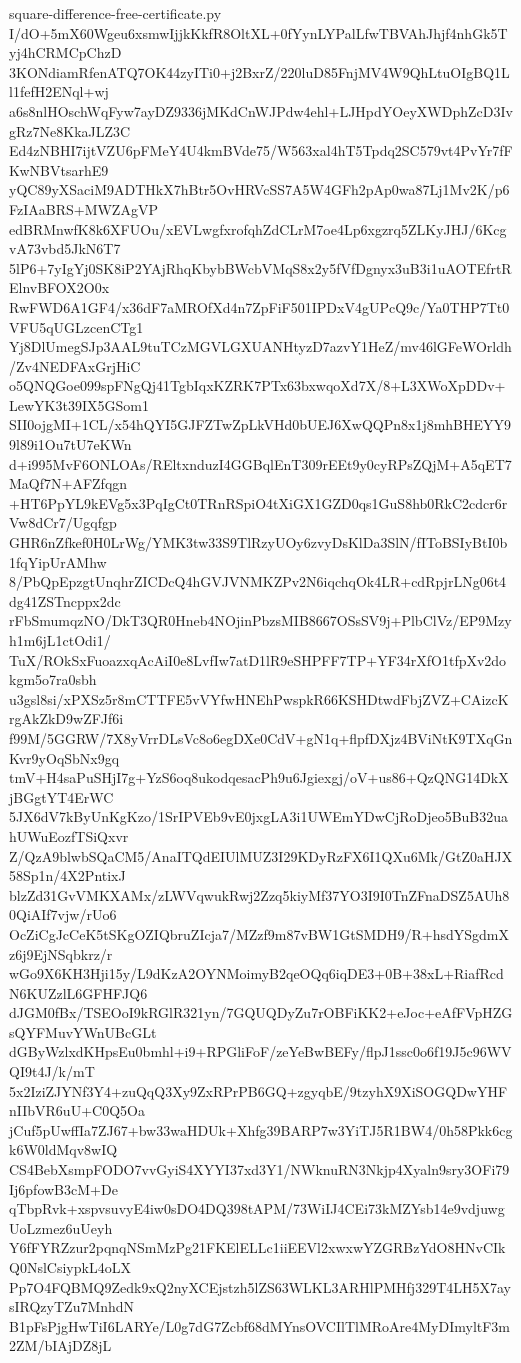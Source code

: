 \documentclass[11pt]{article}
\theoremstyle{definition}
\theoremstyle{remark}
\begin{document}
\begin{filecontents*}[overwrite]{square-difference-free-certificate.py}
I/dO+5mX60Wgeu6xsmwIjjkKkfR8OltXL+0fYynLYPalLfwTBVAhJhjf4nhGk5Tyj4hCRMCpChzD
3KONdiamRfenATQ7OK44zyITi0+j2BxrZ/220luD85FnjMV4W9QhLtuOIgBQ1Ll1fefH2ENql+wj
a6s8nlHOschWqFyw7ayDZ9336jMKdCnWJPdw4ehl+LJHpdYOeyXWDphZcD3IvgRz7Ne8KkaJLZ3C
Ed4zNBHI7ijtVZU6pFMeY4U4kmBVde75/W563xal4hT5Tpdq2SC579vt4PvYr7fFKwNBVtsarhE9
yQC89yXSaciM9ADTHkX7hBtr5OvHRVcSS7A5W4GFh2pAp0wa87Lj1Mv2K/p6FzIAaBRS+MWZAgVP
edBRMnwfK8k6XFUOu/xEVLwgfxrofqhZdCLrM7oe4Lp6xgzrq5ZLKyJHJ/6KcgvA73vbd5JkN6T7
5lP6+7yIgYj0SK8iP2YAjRhqKbybBWcbVMqS8x2y5fVfDgnyx3uB3i1uAOTEfrtRElnvBFOX2O0x
RwFWD6A1GF4/x36dF7aMROfXd4n7ZpFiF501IPDxV4gUPcQ9c/Ya0THP7Tt0VFU5qUGLzcenCTg1
Yj8DlUmegSJp3AAL9tuTCzMGVLGXUANHtyzD7azvY1HeZ/mv46lGFeWOrldh/Zv4NEDFAxGrjHiC
o5QNQGoe099spFNgQj41TgbIqxKZRK7PTx63bxwqoXd7X/8+L3XWoXpDDv+LewYK3t39IX5GSom1
SII0ojgMI+1CL/x54hQYI5GJFZTwZpLkVHd0bUEJ6XwQQPn8x1j8mhBHEYY99l89i1Ou7tU7eKWn
d+i995MvF6ONLOAs/REltxnduzI4GGBqlEnT309rEEt9y0cyRPsZQjM+A5qET7MaQf7N+AFZfqgn
+HT6PpYL9kEVg5x3PqIgCt0TRnRSpiO4tXiGX1GZD0qs1GuS8hb0RkC2cdcr6rVw8dCr7/Ugqfgp
GHR6nZfkef0H0LrWg/YMK3tw33S9TlRzyUOy6zvyDsKlDa3SlN/fIToBSIyBtI0b1fqYipUrAMhw
8/PbQpEpzgtUnqhrZICDcQ4hGVJVNMKZPv2N6iqchqOk4LR+cdRpjrLNg06t4dg41ZSTncppx2dc
rFbSmumqzNO/DkT3QR0Hneb4NOjinPbzsMIB8667OSsSV9j+PlbClVz/EP9Mzyh1m6jL1ctOdi1/
TuX/ROkSxFuoazxqAcAiI0e8LvfIw7atD1lR9eSHPFF7TP+YF34rXfO1tfpXv2dokgm5o7ra0sbh
u3gsl8si/xPXSz5r8mCTTFE5vVYfwHNEhPwspkR66KSHDtwdFbjZVZ+CAizcKrgAkZkD9wZFJf6i
f99M/5GGRW/7X8yVrrDLsVc8o6egDXe0CdV+gN1q+flpfDXjz4BViNtK9TXqGnKvr9yOqSbNx9gq
tmV+H4saPuSHjI7g+YzS6oq8ukodqesacPh9u6Jgiexgj/oV+us86+QzQNG14DkXjBGgtYT4ErWC
5JX6dV7kByUnKgKzo/1SrIPVEb9vE0jxgLA3i1UWEmYDwCjRoDjeo5BuB32uahUWuEozfTSiQxvr
Z/QzA9blwbSQaCM5/AnaITQdEIUlMUZ3I29KDyRzFX6I1QXu6Mk/GtZ0aHJX58Sp1n/4X2PntixJ
blzZd31GvVMKXAMx/zLWVqwukRwj2Zzq5kiyMf37YO3I9I0TnZFnaDSZ5AUh80QiAIf7vjw/rUo6
OcZiCgJcCeK5tSKgOZIQbruZIcja7/MZzf9m87vBW1GtSMDH9/R+hsdYSgdmXz6j9EjNSqbkrz/r
wGo9X6KH3Hji15y/L9dKzA2OYNMoimyB2qeOQq6iqDE3+0B+38xL+RiafRcdN6KUZzlL6GFHFJQ6
dJGM0fBx/TSEOoI9kRGlR321yn/7GQUQDyZu7rOBFiKK2+eJoc+eAfFVpHZGsQYFMuvYWnUBcGLt
dGByWzlxdKHpsEu0bmhl+i9+RPGliFoF/zeYeBwBEFy/flpJ1ssc0o6f19J5c96WVQI9t4J/k/mT
5x2IziZJYNf3Y4+zuQqQ3Xy9ZxRPrPB6GQ+zgyqbE/9tzyhX9XiSOGQDwYHFnIIbVR6uU+C0Q5Oa
jCuf5pUwffIa7ZJ67+bw33waHDUk+Xhfg39BARP7w3YiTJ5R1BW4/0h58Pkk6cgk6W0ldMqv8wIQ
CS4BebXsmpFODO7vvGyiS4XYYI37xd3Y1/NWknuRN3Nkjp4Xyaln9sry3OFi79Ij6pfowB3cM+De
qTbpRvk+xspvsuvyE4iw0sDO4DQ398tAPM/73WiIJ4CEi73kMZYsb14e9vdjuwgUoLzmez6uUeyh
Y6fFYRZzur2pqnqNSmMzPg21FKElELLc1iiEEVl2xwxwYZGRBzYdO8HNvCIkQ0NslCsiypkL4oLX
Pp7O4FQBMQ9Zedk9xQ2nyXCEjstzh5lZS63WLKL3ARHlPMHfj329T4LH5X7aysIRQzyTZu7MnhdN
B1pFsPjgHwTiI6LARYe/L0g7dG7Zcbf68dMYnsOVCIlTlMRoAre4MyDImyltF3m2ZM/bIAjDZ8jL

\end{filecontents*}
\end{document}
